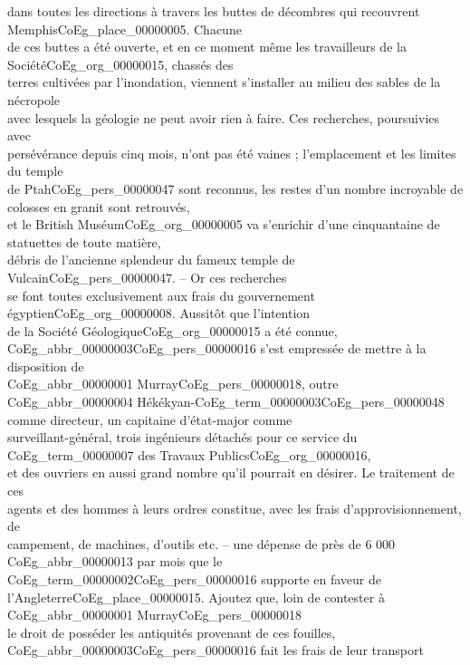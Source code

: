\documentclass{book}
\begin{document}
dans toutes les directions à travers les buttes de décombres qui recouvrent Memphis\gls{CoEg_place_00000005}. Chacune\\
de ces buttes a été ouverte, et en ce moment même les travailleurs de la Société\gls{CoEg_org_00000015}, chassés des\\
terres cultivées par l’inondation, viennent s’installer au milieu des sables de la nécropole\\
avec lesquels la géologie ne peut avoir rien à faire. Ces recherches, poursuivies avec\\
persévérance depuis cinq mois, n’ont pas été vaines ; l’emplacement et les limites du temple\\
de Ptah\gls{CoEg_pers_00000047} sont reconnus, les restes d’un nombre incroyable de colosses en granit sont retrouvés,\\
et le British Muséum\gls{CoEg_org_00000005} va s’enrichir d’une cinquantaine de statuettes de toute matière,\\
débris de l’ancienne splendeur du fameux temple de Vulcain\gls{CoEg_pers_00000047}. – Or ces recherches\\
se font toutes exclusivement aux frais du gouvernement égyptien\gls{CoEg_org_00000008}. Aussitôt que l’intention\\
de la Société Géologique\gls{CoEg_org_00000015} a été connue, \gls{CoEg_abbr_00000003}\gls{CoEg_pers_00000016} s’est empressée de mettre à la disposition de\\
\gls{CoEg_abbr_00000001} Murray\gls{CoEg_pers_00000018}, outre \gls{CoEg_abbr_00000004} Hékékyan-\gls{CoEg_term_00000003}\gls{CoEg_pers_00000048} comme directeur, un capitaine d’état-major comme\\
surveillant-général, trois ingénieurs détachés pour ce service du \gls{CoEg_term_00000007} des Travaux Publics\gls{CoEg_org_00000016},\\
et des ouvriers en aussi grand nombre qu’il pourrait en désirer. Le traitement de ces\\
agents et des hommes à leurs ordres constitue, avec les frais d’approvisionnement, de\\
campement, de machines, d’outils etc. – une dépense de près de 6 000 \gls{CoEg_abbr_00000013} par mois que le\\
\gls{CoEg_term_00000002}\gls{CoEg_pers_00000016} supporte en faveur de l’Angleterre\gls{CoEg_place_00000015}. Ajoutez que, loin de contester à \gls{CoEg_abbr_00000001} Murray\gls{CoEg_pers_00000018}\\
le droit de posséder les antiquités provenant de ces fouilles, \gls{CoEg_abbr_00000003}\gls{CoEg_pers_00000016} fait les frais de leur transport\\
\end{document}
